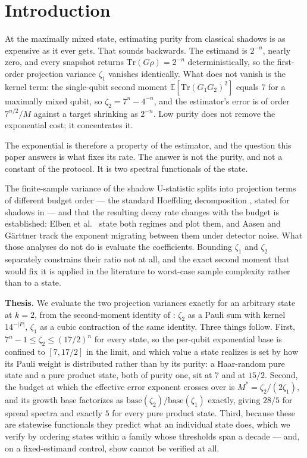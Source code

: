 \hypertarget{introduction}{%
\section{Introduction}\label{introduction}}

At the maximally mixed state, estimating purity from classical shadows is as expensive as it ever
gets. That sounds backwards. The estimand is \(2^{-n}\), nearly zero, and every snapshot returns
\(\mathrm{Tr}(G\rho) = 2^{-n}\) deterministically, so the first-order projection variance
\(\zeta_1\) vanishes identically. What does not vanish is the kernel term: the single-qubit second
moment \(\mathbb{E}[\mathrm{Tr}(G_1G_2)^2]\) equals \(7\) for a maximally mixed qubit, so
\(\zeta_2 = 7^n - 4^{-n}\), and the estimator's error is of order \(7^{n/2}/M\) against a target
shrinking as \(2^{-n}\). Low purity does not remove the exponential cost; it concentrates it.

The exponential is therefore a property of the estimator, and the question this paper answers is
what fixes its rate. The answer is not the purity, and not a constant of the protocol. It is two
spectral functionals of the state.

The finite-sample variance of the shadow U-statistic splits into projection terms of different
budget order --- the standard Hoeffding decomposition \cite{hoeffding1948, serfling1980}, stated
for shadows in \cite{huang2020shadows} --- and that the resulting decay rate changes with the
budget is established: Elben et al.~\cite{elben2020mixed} state both regimes and plot them, and
Aasen and G\"arttner \cite{aasen2026limitations} track the exponent migrating between them under
detector noise. What those analyses do not do is evaluate the coefficients. Bounding \(\zeta_1\)
and \(\zeta_2\) separately constrains their ratio not at all, and the exact second moment that
would fix it is applied in the literature to worst-case sample complexity rather than to a state.

\textbf{Thesis.} We evaluate the two projection variances exactly for an arbitrary state at
\(k = 2\), from the second-moment identity of \cite{huang2020shadows}: \(\zeta_2\) as a Pauli sum
with kernel \(14^{-|P|}\), \(\zeta_1\) as a cubic contraction of the same identity. Three things
follow. First, \(7^n - 1 \le \zeta_2 \le (17/2)^n\) for every state, so the per-qubit exponential
base is confined to \([7, 17/2]\) in the limit, and which value a state realizes is set by how its
Pauli weight is distributed rather than by its purity: a Haar-random pure state and a pure product
state, both of purity one, sit at \(7\) and at \(15/2\). Second, the budget at which the effective
error exponent crosses over is \(M^* = \zeta_2/(2\zeta_1)\), and its growth base factorizes as
\(\mathrm{base}(\zeta_2)/\mathrm{base}(\zeta_1)\) exactly, giving \(28/5\) for spread spectra and
exactly \(5\) for every pure product state. Third, because these are statewise functionals they
predict what an individual state does, which we verify by ordering states within a family whose
thresholds span a decade --- and, on a fixed-estimand control, show cannot be verified at all.

